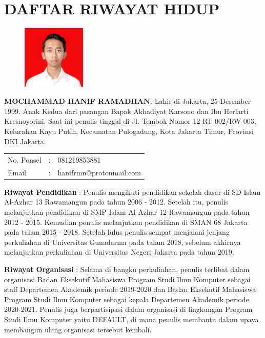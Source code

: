 
\pagestyle{empty}
\chapter*{\centering \large DAFTAR RIWAYAT HIDUP}
\thispagestyle{empty}
\onehalfspacing{}

\begin{figure}
	\vspace{-25pt}
	\begin{center}
		\includegraphics[width=0.27\textwidth]{gambar/pasfoto}
	\end{center}
	\vspace{-40pt}
\end{figure}

\noindent \textbf{MOCHAMMAD HANIF RAMADHAN.} Lahir di Jakarta, 25 Desember 1999.
Anak Kedua dari pasangan Bapak Akhadiyat Karsono dan Ibu Herlarti Kresnoyorini.
Saat ini penulis tinggal di Jl. Tembok Nomor 12 RT 002/RW 003, Kelurahan Kayu
Putih, Kecamatan Pulogadung, Kota Jakarta Timur, Provinsi DKI Jakarta.

\vspace{1cm}
\noindent
\begin{tabular}{lcl}
	No. Ponsel	& :&  081219853881 \\
	Email	& :&  hanifrmn@protonmail.com
\end{tabular}
\vspace{0.5cm}

\noindent \textbf{Riwayat Pendidikan} : Penulis mengikuti pendidikan sekolah
dasar di SD Islam Al-Azhar 13 Rawamangun pada tahun 2006 - 2012. Setelah itu,
penulis melanjutkan pendidikan di SMP Islam Al-Azhar 12 Rawamangun pada tahun
2012 - 2015. Kemudian penulis melanjutkan pendidikan di SMAN 68 Jakarta pada
tahun 2015 - 2018. Setelah lulus penulis sempat menjalani jenjang perkuliahan di 
Universitas Gunadarma pada tahun 2018, sebelum akhirnya melanjutkan perkuliahan 
di Universitas Negeri Jakarta pada tahun 2019.

\noindent \textbf{Riwayat Organisasi} : Selama di bangku perkuliahan, penulis 
terlibat dalam organisasi Badan Eksekutif Mahasiswa Program Studi Ilmu Komputer 
sebagai staff Departemen Akademik periode 2019-2020 dan Badan Eksekutif 
Mahasiswa Program Studi Ilmu Komputer sebagai kepala Departemen Akademik periode 
2020-2021. Penulis juga berpartisipasi dalam organisasi di lingkungan Program 
Studi Ilmu Komputer yaitu DEFAULT, di mana penulis membantu dalam upaya 
membangun ulang organisasi tersebut kembali.
